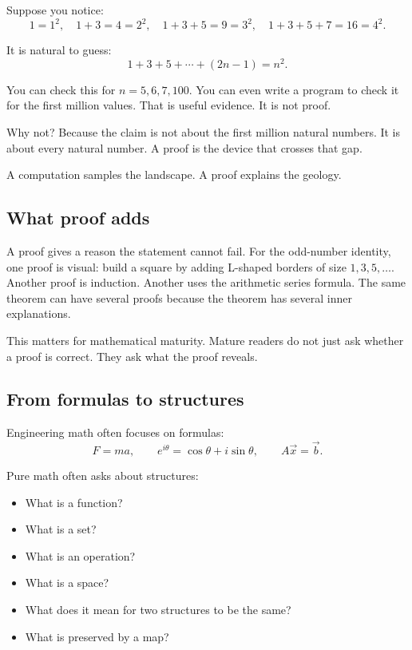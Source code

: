 \documentclass[12pt]{article}
\begin{document}
Suppose you notice:
\[
1=1^2,\quad 1+3=4=2^2,\quad 1+3+5=9=3^2,\quad 1+3+5+7=16=4^2.
\]

It is natural to guess:
\[
1+3+5+\cdots+(2n-1)=n^2.
\]

You can check this for $n=5,6,7,100$. You can even write a program to check it for the first million values. That is useful evidence. It is not proof.

Why not? Because the claim is not about the first million natural numbers. It is about every natural number. A proof is the device that crosses that gap.

\begin{intuitionbox}
A computation samples the landscape. A proof explains the geology.
\end{intuitionbox}

\subsection{What proof adds}

A proof gives a reason the statement cannot fail. For the odd-number identity, one proof is visual: build a square by adding L-shaped borders of size $1,3,5,\ldots$. Another proof is induction. Another uses the arithmetic series formula. The same theorem can have several proofs because the theorem has several inner explanations.

This matters for mathematical maturity. Mature readers do not just ask whether a proof is correct. They ask what the proof reveals.

\subsection{From formulas to structures}

Engineering math often focuses on formulas:
\[
F=ma,\qquad e^{i\theta}=\cos\theta+i\sin\theta,\qquad A\vec{x}=\vec{b}.
\]

Pure math often asks about structures:

\begin{itemize}
\item What is a function?
\item What is a set?
\item What is an operation?
\item What is a space?
\item What does it mean for two structures to be the same?
\item What is preserved by a map?
\end{itemize}
\end{document}
